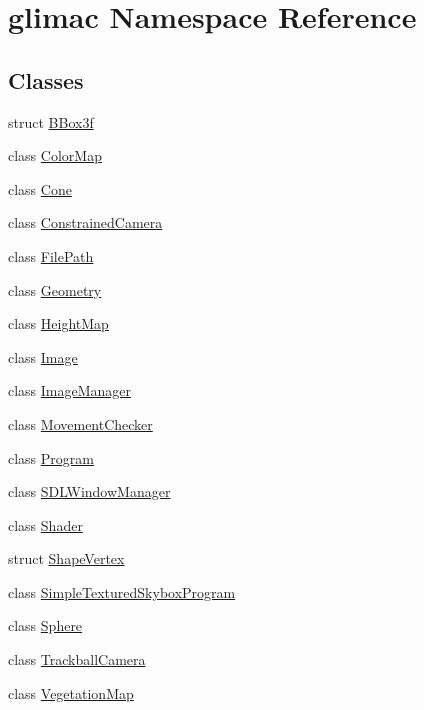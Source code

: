 \hypertarget{namespaceglimac}{}\section{glimac Namespace Reference}
\label{namespaceglimac}
\subsection*{Classes}
\begin{DoxyCompactItemize}
\item 
struct \hyperlink{structglimac_1_1_b_box3f}{B\+Box3f}
\item 
class \hyperlink{classglimac_1_1_color_map}{Color\+Map}
\item 
class \hyperlink{classglimac_1_1_cone}{Cone}
\item 
class \hyperlink{classglimac_1_1_constrained_camera}{Constrained\+Camera}
\item 
class \hyperlink{classglimac_1_1_file_path}{File\+Path}
\item 
class \hyperlink{classglimac_1_1_geometry}{Geometry}
\item 
class \hyperlink{classglimac_1_1_height_map}{Height\+Map}
\item 
class \hyperlink{classglimac_1_1_image}{Image}
\item 
class \hyperlink{classglimac_1_1_image_manager}{Image\+Manager}
\item 
class \hyperlink{classglimac_1_1_movement_checker}{Movement\+Checker}
\item 
class \hyperlink{classglimac_1_1_program}{Program}
\item 
class \hyperlink{classglimac_1_1_s_d_l_window_manager}{S\+D\+L\+Window\+Manager}
\item 
class \hyperlink{classglimac_1_1_shader}{Shader}
\item 
struct \hyperlink{structglimac_1_1_shape_vertex}{Shape\+Vertex}
\item 
class \hyperlink{classglimac_1_1_simple_textured_skybox_program}{Simple\+Textured\+Skybox\+Program}
\item 
class \hyperlink{classglimac_1_1_sphere}{Sphere}
\item 
class \hyperlink{classglimac_1_1_trackball_camera}{Trackball\+Camera}
\item 
class \hyperlink{classglimac_1_1_vegetation_map}{Vegetation\+Map}
\end{DoxyCompactItemize}
